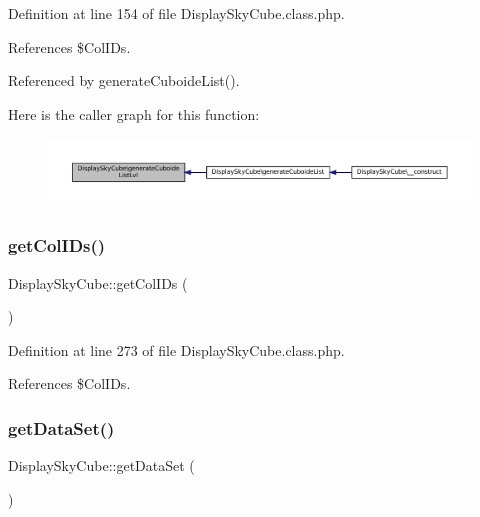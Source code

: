 Definition at line 154 of file Display\+Sky\+Cube.\+class.\+php.



References \$\+Col\+I\+Ds.



Referenced by generate\+Cuboide\+List().

Here is the caller graph for this function\+:\nopagebreak
\begin{figure}[H]
\begin{center}
\leavevmode
\includegraphics[width=350pt]{class_display_sky_cube_a13fd070a47a4e316504c87a125629128_icgraph}
\end{center}
\end{figure}
\mbox{\label{class_display_sky_cube_a35ef27a351a22bc855de83916e83ff4c}} 
\subsubsection{\texorpdfstring{get\+Col\+I\+Ds()}{getColIDs()}}
{\footnotesize\ttfamily Display\+Sky\+Cube\+::get\+Col\+I\+Ds (\begin{DoxyParamCaption}{ }\end{DoxyParamCaption})}



Definition at line 273 of file Display\+Sky\+Cube.\+class.\+php.



References \$\+Col\+I\+Ds.

\mbox{\label{class_display_sky_cube_a2fb751d40b6b7013370bde414aa38c45}} 
\subsubsection{\texorpdfstring{get\+Data\+Set()}{getDataSet()}}
{\footnotesize\ttfamily Display\+Sky\+Cube\+::get\+Data\+Set (\begin{DoxyParamCaption}{ }\end{DoxyParamCaption})}



